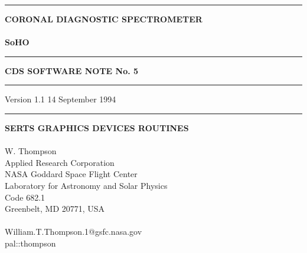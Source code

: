 
\setlength{\oddsidemargin}{0in}		%
\setlength{\topmargin}{-0.5in}		%
\setlength{\textwidth}{6.5in}		%
\setlength{\textheight}{9in}		%

\addtolength{\parskip}{0.5\baselineskip}


\newenvironment{centerpage}{\mbox{} \protect\vspace*{\fill}}{
	\protect\vspace*{\fill} \mbox{} \protect\\ \mbox{}}

		

\begin{titlepage}
\hrule
{\noindent\bf CORONAL DIAGNOSTIC SPECTROMETER}\\
\vspace{-0.7\baselineskip}\\
{\noindent\Huge\bf SoHO}
\vspace{2mm}
\hrule
\vspace{3mm}
\centerline{\bf CDS SOFTWARE NOTE No. 5}
\vspace{3mm}
\hrule
\noindent Version 1.1 \hfill 14 September 1994
\vspace{2mm}
\hrule

\begin{centerpage}

\begin{center}
{\Large\bf SERTS GRAPHICS DEVICES ROUTINES}\\
\mbox{}\\
W. Thompson\\
Applied Research Corporation\\
NASA Goddard Space Flight Center\\
Laboratory for Astronomy and Solar Physics\\
Code 682.1\\
Greenbelt, MD 20771, USA\\
\mbox{}\\
William.T.Thompson.1@gsfc.nasa.gov\\
pal::thompson
\end{center}

\end{centerpage}

\end{titlepage}

